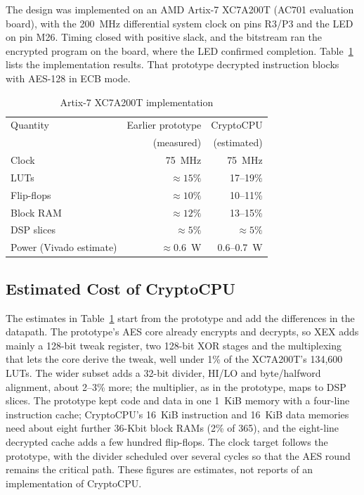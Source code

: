\documentclass[conference,a4paper]{IEEEtran}
\begin{document}
The design was implemented on an AMD Artix-7 XC7A200T (AC701 evaluation
board), with the 200~MHz differential system clock on pins R3/P3 and the LED
on pin M26. Timing closed with positive slack, and the bitstream ran the
encrypted program on the board, where the LED confirmed completion.
Table~\ref{tab:fpga} lists the implementation results. That prototype
decrypted instruction blocks with AES-128 in ECB mode.

\begin{table}[b]
\caption{Artix-7 XC7A200T implementation}
\label{tab:fpga}
\centering
\small
\begin{tabular}{@{}lrr@{}}
\toprule
Quantity & Earlier prototype & CryptoCPU \\
 & (measured) & (estimated) \\
\midrule
Clock & 75~MHz & 75~MHz \\
LUTs & ${\approx}15\%$ & 17--19\% \\
Flip-flops & ${\approx}10\%$ & 10--11\% \\
Block RAM & ${\approx}12\%$ & 13--15\% \\
DSP slices & ${\approx}5\%$ & ${\approx}5\%$ \\
Power (Vivado estimate) & ${\approx}0.6$~W & 0.6--0.7~W \\
\bottomrule
\end{tabular}
\end{table}

\subsection{Estimated Cost of CryptoCPU}
The estimates in Table~\ref{tab:fpga} start from the prototype and add the
differences in the datapath. The prototype's AES core already encrypts and
decrypts, so XEX adds mainly a 128-bit tweak register, two 128-bit XOR stages
and the multiplexing that lets the core derive the tweak, well under 1\% of the
XC7A200T's 134,600 LUTs. The wider subset adds a 32-bit divider, HI/LO and
byte/halfword alignment, about 2--3\% more; the multiplier, as in the
prototype, maps to DSP slices. The prototype kept code and data in one
1~KiB memory with a four-line instruction cache; CryptoCPU's 16~KiB
instruction and 16~KiB data memories need about eight further 36-Kbit block
RAMs (2\% of 365), and the eight-line decrypted cache adds a few hundred
flip-flops. The clock target follows the prototype, with the divider scheduled
over several cycles so that the AES round remains the critical path. These
figures are estimates, not reports of an implementation of CryptoCPU.
\end{document}
